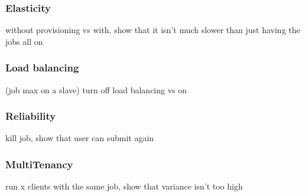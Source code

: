 
\subsubsection{Elasticity}

without provisioning vs with, show that it isn't much slower than just having the jobs all on

\subsubsection{Load balancing}

(job max on a slave)
turn off load balancing vs on
\subsubsection{Reliability}

kill job, show that user can submit again

\subsubsection{MultiTenancy}
run x clients with the same job, show that variance isn't too high
